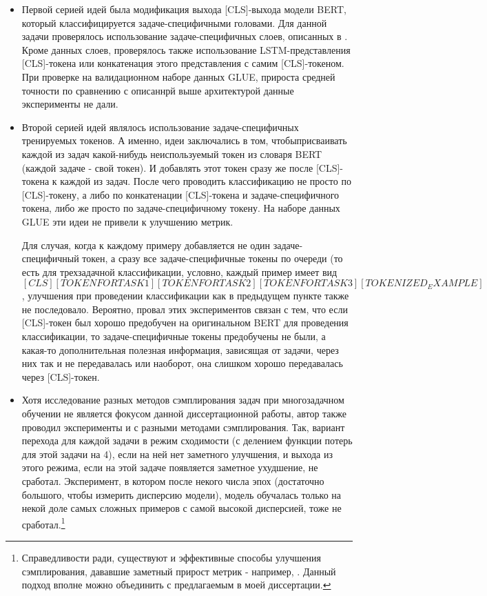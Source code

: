 \begin{itemize} 
 \item Первой серией идей была модификация выхода [CLS]-выхода модели BERT, который классифицируется задаче-специфичными головами. Для данной задачи проверялось использование задаче-специфичных слоев, описанных в \cite{GhostBERT2021, TaskEmbedded2021, el-nouby2021xcit}. Кроме данных слоев, проверялось также использование LSTM-представления [CLS]-токена или конкатенация этого представления с самим [CLS]-токеном. При проверке на валидационном наборе данных GLUE, прироста средней точности по сравнению с описаннрй выше архитектурой данные эксперименты не дали. 
\item Второй серией идей являлось использование задаче-специфичных тренируемых токенов. А именно, идеи заключались в том, чтобыприсваивать каждой из задач какой-нибудь неиспользуемый токен из словаря BERT (каждой задаче - свой токен). И добавлять этот токен сразу же после [CLS]-токена к каждой из задач. После чего проводить классификацию не просто по [CLS]-токену, а либо по конкатенации [CLS]-токена и задаче-специфичного токена, либо же просто по задаче-специфичному токену. На наборе данных GLUE эти идеи не привели к улучшению метрик.

 Для случая, когда к каждому примеру добавляется не один задаче-специфичный токен, а сразу все задаче-специфичные токены по очереди (то есть для трехзадачной классификации, условно, каждый пример имеет вид \textit{$[CLS] [TOKEN FOR TASK1] [TOKEN FOR TASK2] [TOKEN FOR TASK3] [TOKENIZED_EXAMPLE]$}, улучшения при проведении классификации как в предыдущем пункте также не последовало. 
Вероятно, провал этих экспериментов связан с тем, что если [CLS]-токен был хорошо предобучен на оригинальном BERT для проведения классификации, то задаче-специфичные токены предобучены не были, а какая-то дополнительная полезная информация, зависящая от задачи, через них так и не передавалась или наоборот, она слишком хорошо передавалась через [CLS]-токен. 

\item Хотя исследование разных методов сэмплирования задач при многозадачном обучении не является фокусом данной диссертационной работы, автор также проводил эксперименты и с разными методами сэмплирования. Так, вариант перехода для каждой задачи в режим сходимости (с делением функции потерь для этой задачи на 4), если на ней нет заметного улучшения, и выхода из этого режима, если на этой задаче появляется заметное ухудшение, не сработал. Эксперимент, в котором после некого числа эпох (достаточно большого, чтобы измерить дисперсию модели), модель обучалась только на некой доле самых сложных примеров с самой высокой дисперсией, тоже не сработал.\footnote{Справедливости ради, существуют и эффективные способы улучшения сэмплирования, дававшие заметный прирост метрик - например, \cite{GradTS}. Данный подход вполне можно объединить с предлагаемым в моей диссертации.}
\end{itemize}

